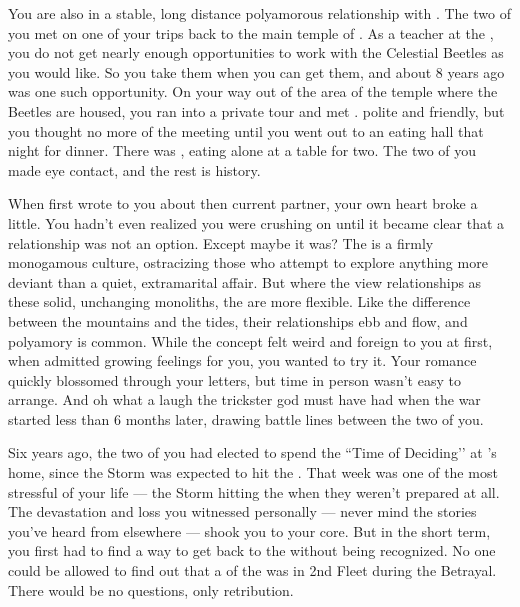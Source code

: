 \documentclass[char]{GL2020}
\begin{document}
You are also in a stable, long distance polyamorous relationship with \cJuniorStatesman{\intro}. The two of you met on one of your trips back to the main temple of \cTechGod{}. As a teacher at the \pSchool{}, you do not get nearly enough opportunities to work with the Celestial Beetles as you would like. So you take them when you can get them, and about 8 years ago was one such opportunity. On your way out of the area of the temple where the Beetles are housed, you ran into a private tour and met \cJuniorStatesman{}. \cJuniorStatesman{\Theywere} polite and friendly, but you thought no more of the meeting until you went out to an eating hall that night for dinner. There was \cJuniorStatesman{}, eating alone at a table for two. The two of you made eye contact, and the rest is history. 

When \cJuniorStatesman{} first wrote to you about \cJuniorStatesman{\their} then current partner, your own heart broke a little. You hadn’t even realized you were crushing on \cJuniorStatesman{\them} until it became clear that a relationship was not an option. Except maybe it was? The \pTech{} is a firmly monogamous culture, ostracizing those who attempt to explore anything more deviant than a quiet, extramarital affair. But where the \pTech{} view relationships as these solid, unchanging monoliths, the \pShippies{} are more flexible. Like the difference between the mountains and the tides, their relationships ebb and flow, and polyamory is common. While the concept felt weird and foreign to you at first, when \cJuniorStatesman{} admitted \cJuniorStatesman{\their} growing feelings for you, you wanted to try it. Your romance quickly blossomed through your letters, but time in person wasn’t easy to arrange. And oh what a laugh the trickster god must have had when the war started less than 6 months later, drawing battle lines between the two of you. 

Six years ago, the two of you had elected to spend the ``Time of Deciding’’ at \cJuniorStatesman{}’s home, since the Storm was expected to hit the \pTech{}. That week was one of the most stressful of your life — the Storm hitting the \pShip{} when they weren’t prepared at all. The devastation and loss you witnessed personally — never mind the stories you’ve heard from elsewhere — shook you to your core. But in the short term, you first had to find a way to get back to the \pSchool{} without being recognized. No one could be allowed to find out that a \cBeetle{\cleric} of the \pTech{} was in 2nd Fleet during the Betrayal. There would be no questions, only retribution.
\end{document}
